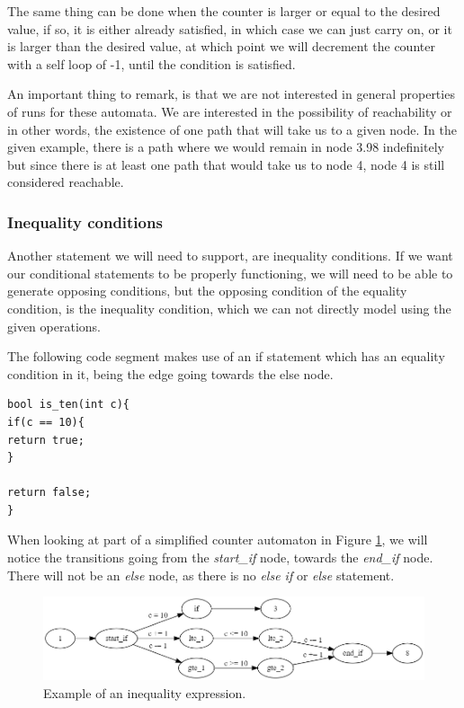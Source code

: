 \documentclass[12pt]{article}
\begin{document}
The same thing can be done when the counter is larger or equal to the desired value, if so, it is either already satisfied, in which case we can just carry on, or it is larger than the desired value, at which point we will decrement the counter with a self loop of -1, until the condition is satisfied.

An important thing to remark, is that we are not interested in general properties of runs for these automata. We are interested in the possibility of reachability or in other words, the existence of one path that will take us to a given node. In the given example, there is a path where we would remain in node 3.98 indefinitely but since there is at least one path that would take us to node 4, node 4 is still considered reachable.

\subsubsection{Inequality conditions}
\label{sec:inequality}
Another statement we will need to support, are inequality conditions. If we want our conditional statements to be properly functioning, we will need to be able to generate opposing conditions, but the opposing condition of the equality condition, is the inequality condition, which we can not directly model using the given operations.

The following code segment makes use of an if statement which has an equality condition in it, being the edge going towards the else node.

\begin{lstlisting}[style=CStyle]
bool is_ten(int c){
if(c == 10){
return true;
}

return false;
}
\end{lstlisting}

When looking at part of a simplified counter automaton in Figure \ref{fig:inequality_expression}, we will notice the transitions going from the \textit{start\_if} node, towards the \textit{end\_if} node. There will not be an \textit{else} node, as there is no \textit{else if} or \textit{else} statement.

\begin{figure}[h]
	\centering
	\includegraphics[width=\linewidth]{inequality_expression}
	\caption{Example of an inequality expression.}
	\label{fig:inequality_expression}
\end{figure}
\end{document}

